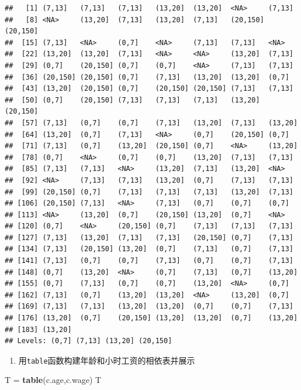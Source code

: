 \documentclass[]{article}
\newenvironment{Shaded}{\begin{snugshade}}{\end{snugshade}}
\newcommand{\KeywordTok}[1]{\textcolor[rgb]{0.13,0.29,0.53}{\textbf{#1}}}
\newcommand{\NormalTok}[1]{#1}
\newcommand{\StringTok}[1]{\textcolor[rgb]{0.31,0.60,0.02}{#1}}
\providecommand{\tightlist}{%
  \setlength{\itemsep}{0pt}\setlength{\parskip}{0pt}}
\begin{document}
\begin{verbatim}
##   [1] (7,13]   (7,13]   (7,13]   (13,20]  (13,20]  <NA>     (7,13]  
##   [8] <NA>     (13,20]  (7,13]   (13,20]  (7,13]   (20,150] (20,150]
##  [15] (7,13]   <NA>     (0,7]    <NA>     (7,13]   (7,13]   <NA>    
##  [22] (13,20]  (13,20]  (7,13]   <NA>     <NA>     (13,20]  (7,13]  
##  [29] (0,7]    (20,150] (0,7]    (0,7]    <NA>     (7,13]   (7,13]  
##  [36] (20,150] (20,150] (0,7]    (7,13]   (13,20]  (13,20]  (0,7]   
##  [43] (13,20]  (20,150] (0,7]    (20,150] (20,150] (7,13]   (7,13]  
##  [50] (0,7]    (20,150] (7,13]   (7,13]   (7,13]   (13,20]  (20,150]
##  [57] (7,13]   (0,7]    (0,7]    (7,13]   (13,20]  (7,13]   (13,20] 
##  [64] (13,20]  (0,7]    (7,13]   <NA>     (0,7]    (20,150] (0,7]   
##  [71] (7,13]   (0,7]    (13,20]  (20,150] (0,7]    <NA>     (13,20] 
##  [78] (0,7]    <NA>     (0,7]    (0,7]    (13,20]  (7,13]   (7,13]  
##  [85] (7,13]   (7,13]   <NA>     (13,20]  (7,13]   (13,20]  <NA>    
##  [92] <NA>     (7,13]   (7,13]   (13,20]  (0,7]    (7,13]   (7,13]  
##  [99] (20,150] (0,7]    (7,13]   (7,13]   (7,13]   (13,20]  (7,13]  
## [106] (20,150] (7,13]   <NA>     (7,13]   (0,7]    (0,7]    (0,7]   
## [113] <NA>     (13,20]  (0,7]    (20,150] (13,20]  (0,7]    <NA>    
## [120] (0,7]    <NA>     (20,150] (0,7]    (7,13]   (7,13]   (7,13]  
## [127] (7,13]   (13,20]  (7,13]   (7,13]   (20,150] (0,7]    (7,13]  
## [134] (7,13]   (20,150] (13,20]  (0,7]    (7,13]   (0,7]    (7,13]  
## [141] (7,13]   (0,7]    (0,7]    (7,13]   (0,7]    (0,7]    (7,13]  
## [148] (0,7]    (13,20]  <NA>     (0,7]    (7,13]   (0,7]    (13,20] 
## [155] (0,7]    (7,13]   (0,7]    (0,7]    (13,20]  <NA>     (0,7]   
## [162] (7,13]   (0,7]    (13,20]  (13,20]  <NA>     (13,20]  (0,7]   
## [169] (7,13]   (7,13]   (13,20]  (13,20]  (0,7]    (0,7]    (7,13]  
## [176] (13,20]  (0,7]    (20,150] (13,20]  (13,20]  (0,7]    (13,20] 
## [183] (13,20] 
## Levels: (0,7] (7,13] (13,20] (20,150]
\end{verbatim}

\begin{enumerate}
\def\labelenumi{\alph{enumi}.}
\setcounter{enumi}{1}
\tightlist
\item
  用\texttt{table}函数构建年龄和小时工资的相依表并展示
\end{enumerate}

\begin{Shaded}
\begin{Highlighting}[]
\NormalTok{T =}\StringTok{ }\KeywordTok{table}\NormalTok{(c.age,c.wage)}
\NormalTok{T}
\end{Highlighting}
\end{Shaded}
\end{document}
